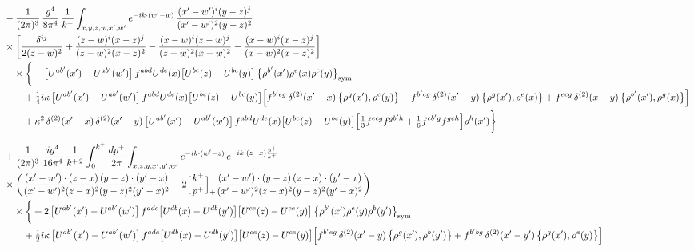 \documentclass[10pt]{article}
\numberwithin{equation}{section}
\begin{document}
\begin{align}
&-\frac{1}{(2\pi)^{3}}\,\frac{g^{4}}{8\pi^{4}}\,\frac{1}{k^{+}}\int_{x,y,z,w,x^{\prime},w^{\prime}}e^{-ik\cdot(w^{\prime}-w)}\,\frac{(x^{\prime}-w^{\prime})^{i}(y-z)^{j}}{(x^{\prime}-w^{\prime})^{2}(y-z)^{2}}\notag\\
&\times\bigg[\frac{\delta^{ij}}{2(z-w)^{2}}+\frac{(z-w)^{i}(x-z)^{j}}{(z-w)^{2}(x-z)^{2}}-\frac{(x-w)^{i}(z-w)^{j}}{(z-w)^{2}(x-w)^{2}}-\frac{(x-w)^{i}(x-z)^{j}}{(x-w)^{2}(x-z)^{2}}\bigg]\notag\\
&\quad\times\bigg\{+\big[U^{ab^{\prime}}(x^{\prime})-U^{ab^{\prime}}(w^{\prime})\big]\,f^{abd}U^{de}(x)\big[U^{bc}(z)-U^{bc}(y)\big]\,\big\{\rho^{b^{\prime}}(x^{\prime})\rho^{e}(x)\rho^{c}(y)\big\}_{\rm sym}\notag\\
&\qquad+\tfrac14 i\kappa\,\big[U^{ab^{\prime}}(x^{\prime})-U^{ab^{\prime}}(w^{\prime})\big]\,f^{abd}U^{de}(x)\big[U^{bc}(z)-U^{bc}(y)\big]\Big[f^{b^{\prime}eg}\,\delta^{(2)}(x^{\prime}-x)\,\big\{\rho^{g}(x^{\prime}),\rho^{c}(y)\big\}+f^{b^{\prime}cg}\,\delta^{(2)}(x^{\prime}-y)\,\big\{\rho^{g}(x^{\prime}),\rho^{e}(x)\big\}+f^{ecg}\,\delta^{(2)}(x-y)\,\big\{\rho^{b^{\prime}}(x^{\prime}),\rho^{g}(x)\big\}\Big]\notag\\
&\qquad+\kappa^{2}\,\delta^{(2)}(x^{\prime}-x)\,\delta^{(2)}(x^{\prime}-y)\,\big[U^{ab^{\prime}}(x^{\prime})-U^{ab^{\prime}}(w^{\prime})\big]\,f^{abd}U^{de}(x)\big[U^{bc}(z)-U^{bc}(y)\big]\Big[\tfrac13f^{ecg}f^{gb^{\prime}h}+\tfrac16f^{cb^{\prime}g}f^{geh}\Big]\rho^{h}(x^{\prime})\bigg\}\notag\\[6pt]
&+\frac{1}{(2\pi)^{3}}\,\frac{ig^{4}}{16\pi^{4}}\,\frac{1}{k^{+\,2}}\int_{0}^{k^{+}}\frac{dp^{+}}{2\pi}\int_{x,z,y,x^{\prime},y^{\prime},w^{\prime}}e^{-ik\cdot(w^{\prime}-z)}\,e^{-ik\cdot(z-x)\frac{p^{+}}{k^{+}}}\notag\\
&\times\bigg(\frac{(x^{\prime}-w^{\prime})\cdot(z-x)\,(y-z)\cdot(y^{\prime}-x)}{(x^{\prime}-w^{\prime})^{2}(z-x)^{2}(y-z)^{2}(y^{\prime}-x)^{2}}-2\Big[\frac{k^{+}}{p^{+}}\Big]_{+}\frac{(x^{\prime}-w^{\prime})\cdot(y-z)\,(z-x)\cdot(y^{\prime}-x)}{(x^{\prime}-w^{\prime})^{2}(z-x)^{2}(y-z)^{2}(y^{\prime}-x)^{2}}\bigg)\notag\\
&\quad\times\bigg\{+2\,\big[U^{ab^{\prime}}(x^{\prime})-U^{ab^{\prime}}(w^{\prime})\big]\,f^{adc}\big[U^{db}(x)-U^{db}(y^{\prime})\big]\big[U^{ce}(z)-U^{ce}(y)\big]\,\big\{\rho^{b^{\prime}}(x^{\prime})\rho^{e}(y)\rho^{b}(y^{\prime})\big\}_{\rm sym}\notag\\
&\qquad+\tfrac12 i\kappa\,\big[U^{ab^{\prime}}(x^{\prime})-U^{ab^{\prime}}(w^{\prime})\big]\,f^{adc}\big[U^{db}(x)-U^{db}(y^{\prime})\big]\big[U^{ce}(z)-U^{ce}(y)\big]\Big[f^{b^{\prime}eg}\,\delta^{(2)}(x^{\prime}-y)\,\big\{\rho^{g}(x^{\prime}),\rho^{b}(y^{\prime})\big\}+f^{b^{\prime}bg}\,\delta^{(2)}(x^{\prime}-y^{\prime})\,\big\{\rho^{g}(x^{\prime}),\rho^{e}(y)\big\}\Big]\notag\\

\end{align}
\end{document}
